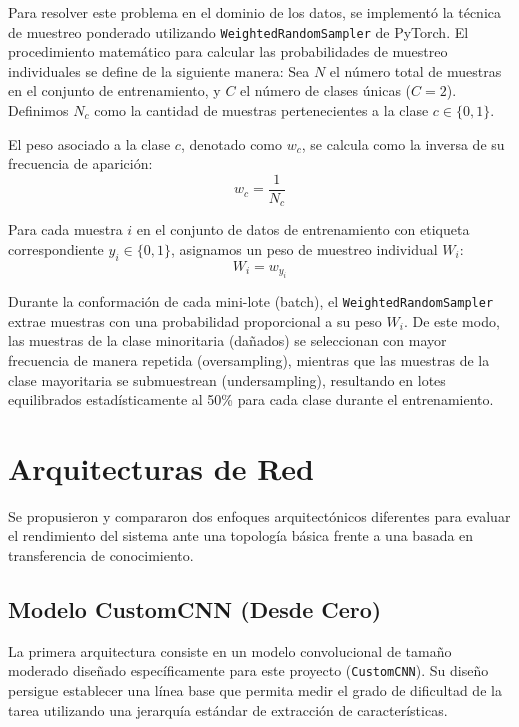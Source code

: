 \documentclass{article}
\begin{document}
Para resolver este problema en el dominio de los datos, se implementó la técnica de muestreo ponderado utilizando \texttt{WeightedRandomSampler} de PyTorch. El procedimiento matemático para calcular las probabilidades de muestreo individuales se define de la siguiente manera:
    Sea $N$ el número total de muestras en el conjunto de entrenamiento, y $C$ el número de clases únicas ($C=2$). Definimos $N_c$ como la cantidad de muestras pertenecientes a la clase $c \in \{0, 1\}$.
    
    El peso asociado a la clase $c$, denotado como $w_c$, se calcula como la inversa de su frecuencia de aparición:
    \begin{equation}
    w_c = \frac{1}{N_c}
    \end{equation}
    
    Para cada muestra $i$ en el conjunto de datos de entrenamiento con etiqueta correspondiente $y_i \in \{0, 1\}$, asignamos un peso de muestreo individual $W_i$:
    \begin{equation}
    W_i = w_{y_i}
    \end{equation}
    
    Durante la conformación de cada mini-lote (batch), el \texttt{WeightedRandomSampler} extrae muestras con una probabilidad proporcional a su peso $W_i$. De este modo, las muestras de la clase minoritaria (dañados) se seleccionan con mayor frecuencia de manera repetida (oversampling), mientras que las muestras de la clase mayoritaria se submuestrean (undersampling), resultando en lotes equilibrados estadísticamente al 50\% para cada clase durante el entrenamiento.

\section{Arquitecturas de Red}
Se propusieron y compararon dos enfoques arquitectónicos diferentes para evaluar el rendimiento del sistema ante una topología básica frente a una basada en transferencia de conocimiento.

\subsection{Modelo CustomCNN (Desde Cero)}
La primera arquitectura consiste en un modelo convolucional de tamaño moderado diseñado específicamente para este proyecto (\texttt{CustomCNN}). Su diseño persigue establecer una línea base que permita medir el grado de dificultad de la tarea utilizando una jerarquía estándar de extracción de características.
\end{document}
